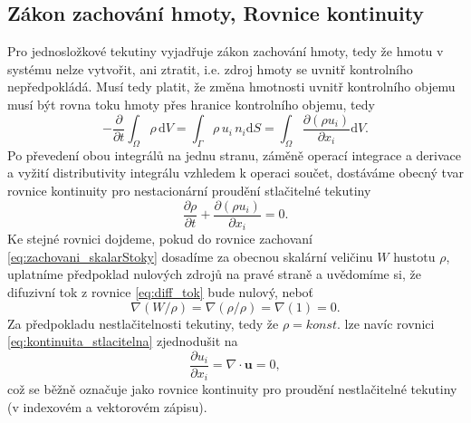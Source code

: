 \subsection{Zákon zachování hmoty, Rovnice kontinuity}
Pro jednosložkové tekutiny vyjadřuje zákon zachování hmoty, tedy že hmotu v systému nelze vytvořit, ani ztratit, i.e. zdroj hmoty se uvnitř kontrolního nepředpokládá. Musí tedy platit, že změna hmotnosti uvnitř kontrolního objemu musí být rovna toku hmoty přes hranice kontrolního objemu, tedy
\begin{equation*}
-\dfrac{\partial}{\partial t}\int_\Omega \rho \,\mathrm{d}V = \int_\Gamma \rho \, u_i \, n_i \mathrm{d}S = \int_\Omega \dfrac{\partial\left(\rho u_i\right)}{\partial x_i}\mathrm{d}V.
\end{equation*}
Po převedení obou integrálů na jednu stranu, záměně operací integrace a derivace a vyžití distributivity integrálu vzhledem k operaci součet, dostáváme obecný tvar rovnice kontinuity pro nestacionární proudění stlačitelné tekutiny
\begin{equation}\label{eq:kontinuita_stlacitelna}
\dfrac{\partial \rho}{\partial t} + \dfrac{\partial \left(\rho u_i\right)}{\partial x_i} = 0.
\end{equation}
Ke stejné rovnici dojdeme, pokud do rovnice zachovaní \ref{eq:zachovani_skalarStoky} dosadíme za obecnou skalární veličinu $W$ hustotu $\rho$, uplatníme předpoklad nulových zdrojů na pravé straně a uvědomíme si, že difuzivní tok z rovnice \ref{eq:diff_tok} bude nulový, neboť 
\begin{equation*}
\nabla(W/\rho) = \nabla(\rho/\rho) = \nabla(1) = 0.
\end{equation*} 
Za předpokladu nestlačitelnosti tekutiny, tedy že $\rho = konst.$ lze navíc rovnici \ref{eq:kontinuita_stlacitelna} zjednodušit na 
\begin{equation}\label{eq:kontinuita_nestlacitelna}
\dfrac{\partial u_i}{\partial x_i} = \nabla\cdot\mathbf{u} = 0,
\end{equation}
což se běžně označuje jako rovnice kontinuity pro proudění nestlačitelné tekutiny (v indexovém a vektorovém zápisu).

